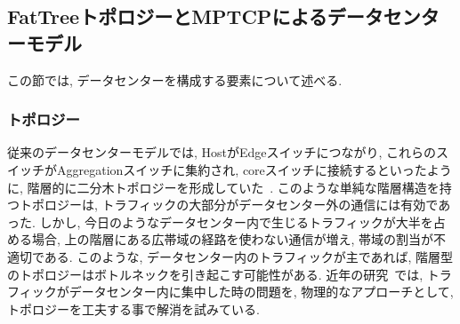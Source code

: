 \documentclass[11pt, a4paper, twocolumn]{jsarticle}
\begin{document}
%
%
%

\subsection{FatTreeトポロジーとMPTCPによるデータセンターモデル}
\label{sec:fattree}
この節では, データセンターを構成する要素について述べる.
\subsubsection{トポロジー}
\label{subsec:topology}
従来のデータセンターモデルでは, HostがEdgeスイッチにつながり,
これらのスイッチがAggregationスイッチに集約され,
coreスイッチに接続するといったように, 階層的に二分木トポロジーを形成していた~\cite{fattree}.
このような単純な階層構造を持つトポロジーは, トラフィックの大部分がデータセンター外の通信には有効であった.
しかし, 今日のようなデータセンター内で生じるトラフィックが大半を占める場合, 上の階層にある広帯域の経路を使わない通信が増え, 帯域の割当が不適切である.
このような, データセンター内のトラフィックが主であれば, 階層型のトポロジーはボトルネックを引き起こす可能性がある.
近年の研究~\cite{fattree,bcube,vl2}では, トラフィックがデータセンター内に集中した時の問題を, 物理的なアプローチとして,
トポロジーを工夫する事で解消を試みている.
\end{document}
